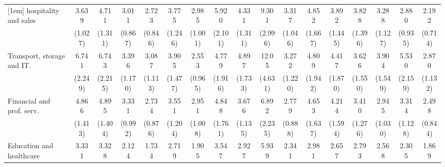 {\begin{tabular}{l*{16}{c}}
[1em]
hospitality and sales&       3.639\sym{***}&       4.711\sym{***}&       3.011\sym{***}&       2.723\sym{**} &       3.775\sym{***}&       2.985\sym{**} &       5.920\sym{***}&       4.331\sym{***}&       9.301\sym{***}&       3.317\sym{***}&       4.852\sym{***}&       3.892\sym{***}&       3.828\sym{***}&       3.288\sym{***}&       2.880\sym{**} &       2.192\sym{*}  \\
                    &     (1.027)         &     (1.311)         &     (0.867)         &     (0.846)         &     (1.246)         &     (1.001)         &     (2.101)         &     (1.311)         &     (2.996)         &     (1.046)         &     (1.667)         &     (1.445)         &     (1.396)         &     (1.127)         &     (0.935)         &     (0.714)         \\
[1em]
Transport, storage and IT.&       6.741\sym{***}&       6.743\sym{***}&       3.396\sym{***}&       3.087\sym{**} &       3.905\sym{***}&       2.553\sym{*}  &       4.779\sym{***}&       4.897\sym{***}&       12.05\sym{***}&       3.272\sym{**} &       4.809\sym{***}&       4.417\sym{***}&       3.626\sym{**} &       3.904\sym{***}&       5.530\sym{***}&       2.870\sym{**} \\
                    &     (2.249)         &     (2.215)         &     (1.170)         &     (1.113)         &     (1.477)         &     (0.965)         &     (1.916)         &     (1.733)         &     (4.631)         &     (1.220)         &     (1.942)         &     (1.870)         &     (1.550)         &     (1.549)         &     (2.159)         &     (1.132)         \\
[1em]
Financial and prof. serv.&       4.866\sym{***}&       4.895\sym{***}&       3.331\sym{***}&       2.734\sym{**} &       3.551\sym{***}&       2.951\sym{**} &       4.848\sym{***}&       3.676\sym{***}&       6.892\sym{***}&       2.779\sym{**} &       4.653\sym{***}&       4.214\sym{***}&       3.410\sym{**} &       2.945\sym{**} &       3.314\sym{***}&       2.498\sym{**} \\
                    &     (1.413)         &     (1.404)         &     (0.992)         &     (0.876)         &     (1.204)         &     (1.008)         &     (1.761)         &     (1.135)         &     (2.235)         &     (0.888)         &     (1.637)         &     (1.594)         &     (1.276)         &     (1.030)         &     (1.128)         &     (0.844)         \\
[1em]
Education and healthcare&       3.331\sym{***}&       3.328\sym{***}&       2.124\sym{*}  &       1.734         &       2.719\sym{**} &       1.905         &       3.547\sym{***}&       2.927\sym{***}&       5.939\sym{***}&       2.341\sym{**} &       2.981\sym{**} &       2.657\sym{**} &       2.793\sym{**} &       2.568\sym{**} &       2.305\sym{*}  &       1.869         \\

\end{tabular}}
